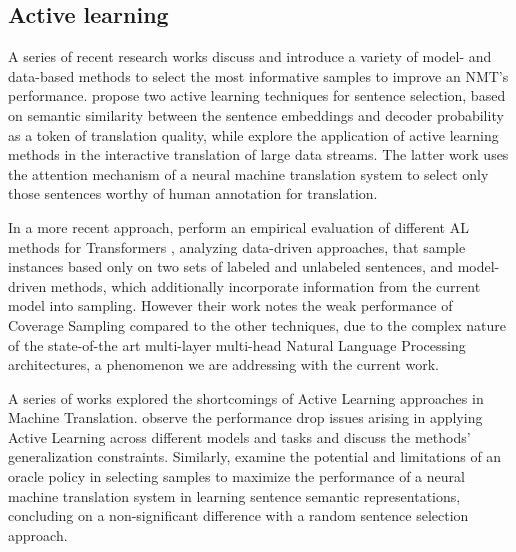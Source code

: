 \subsection{Active learning}
\label{active-learning-interactive}

A series of recent research works discuss and introduce a variety of model- and data-based methods to select the most informative samples to improve an NMT's performance.
\citet{zhang2018active} propose two active learning techniques for sentence selection, based on semantic similarity between the sentence embeddings and decoder probability as a token of translation quality, while \citet{peris2020active} explore the application of active learning methods in the interactive translation of large data streams. The latter work uses the attention mechanism of a neural machine translation system to select only those sentences worthy of human annotation for translation. 

In a more recent approach, \citet{zeng2019empirical} perform an empirical evaluation of different AL methods for Transformers \cite{vaswani2017attention}, analyzing data-driven approaches, that sample instances based only on two sets of labeled and unlabeled sentences, and model-driven methods, which additionally incorporate information from the current model into sampling. 
However their work notes the weak performance of Coverage Sampling compared to the other techniques, due to the complex nature of the state-of-the art multi-layer multi-head Natural Language Processing architectures, a phenomenon we are addressing with the current work.

A series of works explored the shortcomings of Active Learning approaches in Machine Translation. \cite{lowell2018practical} observe the performance drop issues arising in applying Active Learning across different models and tasks and discuss the methods' generalization constraints. Similarly, \citet{koshorek2019limits} examine the potential and limitations of an oracle policy in selecting samples to maximize the performance of a neural machine translation system in learning sentence semantic representations, concluding on a non-significant difference with a random sentence selection approach.
